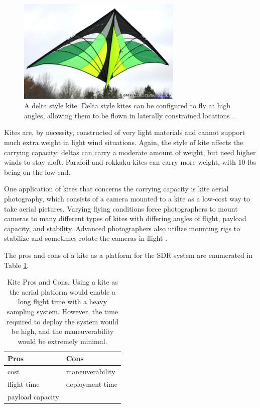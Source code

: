 \begin{figure}[ht]
\centering
\includegraphics[width=0.70\textwidth]{img/delta-kite.jpg}
\caption{A delta style kite. Delta style kites can be configured to fly at high angles, allowing them to be flown in laterally constrained locations \cite{kite_img}.}
\label{fig:delta_kite}
\end{figure}\par
Kites are, by necessity, constructed of very light materials and cannot support much extra weight in light wind situations. Again, the style of kite affects the carrying capacity: deltas can carry a moderate amount of weight, but need higher winds to stay aloft. Parafoil and rokkaku kites can carry more weight, with 10 lbs being on the low end.\par
One application of kites that concerns the carrying capacity is kite aerial photography, which consists of a camera mounted to a kite as a low-cost way to take aerial pictures\cite{kite_iqp}. Varying flying conditions force photographers to mount cameras to many different types of kites with differing angles of flight, payload capacity, and stability. Advanced photographers also utilize mounting rigs to stabilize and sometimes rotate the cameras in flight \cite{kite_iqp}.\par
The pros and cons of a kite as a platform for the SDR system are enumerated in Table \ref{table:kite_pc}.
\begin{table}[ht]
\centering
\caption{Kite Pros and Cons. Using a kite as the aerial platform would enable a long flight time with a heavy sampling system. However, the time required to deploy the system would be high, and the maneuverability would be extremely minimal.}
\label{table:kite_pc}
\begin{tabular}{l|l}
  Pros & Cons \\ \hline
  cost & maneuverability \\
  flight time & deployment time \\
  payload capacity & \\
\end{tabular}
\end{table}\par

